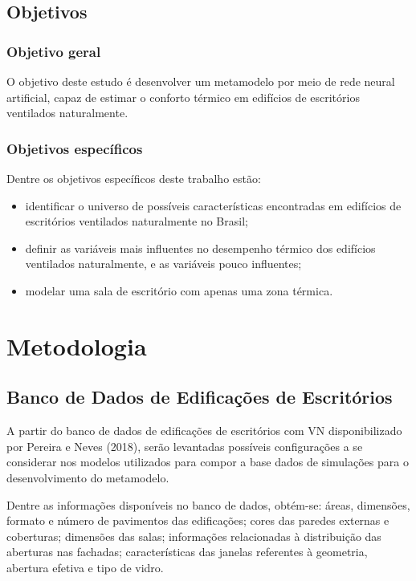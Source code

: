 \documentclass[brazil,hardcopy,openany,a5paper]{ufscthesis}
\begin{document}
	
	\section{Objetivos}
		\subsection{Objetivo geral}

	O objetivo deste estudo é desenvolver um metamodelo por meio de rede neural artificial, capaz de estimar o conforto térmico em edifícios de escritórios ventilados naturalmente.
	
		\subsection{Objetivos específicos}
	
	Dentre os objetivos específicos deste trabalho estão:

		\begin{itemize}
			\item identificar o universo de possíveis características encontradas em edifícios de escritórios ventilados naturalmente no Brasil;
			\item definir as variáveis mais influentes no desempenho térmico dos edifícios ventilados naturalmente, e as variáveis pouco influentes;
			\item modelar uma sala de escritório com apenas uma zona térmica.
		\end{itemize}
	
	\chapter{Metodologia}
		\label{chapter:metodologia}

		\section{Banco de Dados de Edificações de Escritórios}
		
		A partir do banco de dados de edificações de escritórios com VN disponibilizado por Pereira e Neves (2018), serão levantadas possíveis configurações a se considerar nos modelos utilizados para compor a base dados de simulações para o desenvolvimento do metamodelo.
		
		Dentre as informações disponíveis no banco de dados, obtém-se: áreas, dimensões, formato e número de pavimentos das edificações; cores das paredes externas e coberturas; dimensões das salas; informações relacionadas à distribuição das aberturas nas fachadas; características das janelas referentes à geometria, abertura efetiva e tipo de vidro.
		
\end{document}
